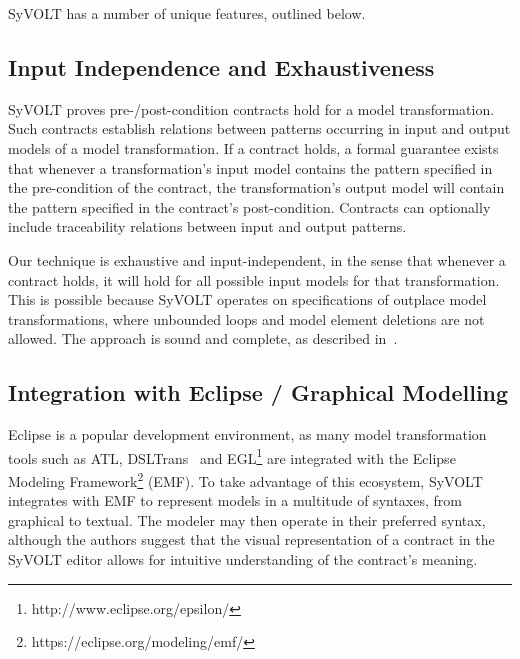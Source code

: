 SyVOLT has a number of unique features, outlined below.

\subsection{Input Independence and Exhaustiveness} 

SyVOLT proves pre-/post-condition contracts hold for a model transformation.
Such contracts establish relations between patterns occurring in input and output
models of a model transformation. If a contract holds, a formal guarantee
exists that whenever a transformation's input model contains the pattern
specified in the pre-condition of the contract, the transformation's output model will contain
the pattern specified in the contract's post-condition. Contracts can 
optionally include traceability relations between input and output patterns. 

Our technique is exhaustive and input-independent, in the sense that whenever a contract holds, it
will hold for all possible input models for that transformation. This is possible
because SyVOLT operates on specifications of outplace model transformations,
where unbounded loops and model element deletions are not allowed. The approach is sound and complete, as described
in~\cite{Lucio2014}.




\subsection{Integration with Eclipse / Graphical Modelling}

Eclipse is a popular development environment, as many model transformation
tools such as ATL, DSLTrans~\cite{Barroca2011} and
EGL\footnote{http://www.eclipse.org/epsilon/} are integrated with the Eclipse Modeling Framework\footnote{https://eclipse.org/modeling/emf/}
(EMF). To take advantage of this ecosystem, SyVOLT integrates with EMF to represent models in a multitude of syntaxes, from
graphical to textual. The modeler may then operate in their preferred syntax, although the authors suggest that the visual representation of a contract in the SyVOLT editor allows for intuitive understanding of the contract's meaning.




